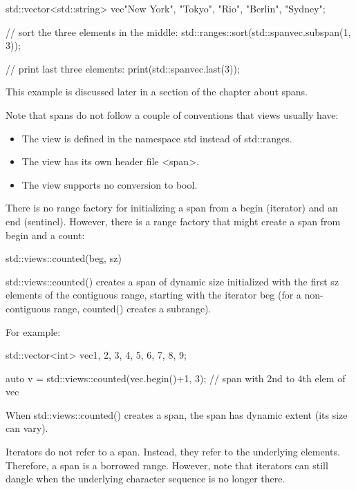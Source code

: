 \begin{cpp}
std::vector<std::string> vec{"New York", "Tokyo", "Rio", "Berlin", "Sydney"};

// sort the three elements in the middle:
std::ranges::sort(std::span{vec}.subspan(1, 3));

// print last three elements:
print(std::span{vec}.last(3));
\end{cpp}

This example is discussed later in a section of the chapter about spans.

Note that spans do not follow a couple of conventions that views usually have:

\begin{itemize}
\item
The view is defined in the namespace std instead of std::ranges.

\item
The view has its own header file <span>.

\item
The view supports no conversion to bool.
\end{itemize}


There is no range factory for initializing a span from a begin (iterator) and an end (sentinel). However, there is a range factory that might create a span from begin and a count:

\begin{cpp}
std::views::counted(beg, sz)
\end{cpp}

std::views::counted() creates a span of dynamic size initialized with the first sz elements of the contiguous range, starting with the iterator beg (for a non-contiguous range, counted() creates a subrange).

For example:

\begin{cpp}
std::vector<int> vec{1, 2, 3, 4, 5, 6, 7, 8, 9};

auto v = std::views::counted(vec.begin()+1, 3); // span with 2nd to 4th elem of vec
\end{cpp}

When std::views::counted() creates a span, the span has dynamic extent (its size can vary).


Iterators do not refer to a span. Instead, they refer to the underlying elements. Therefore, a span is a borrowed range. However, note that iterators can still dangle when the underlying character sequence is no longer there.

